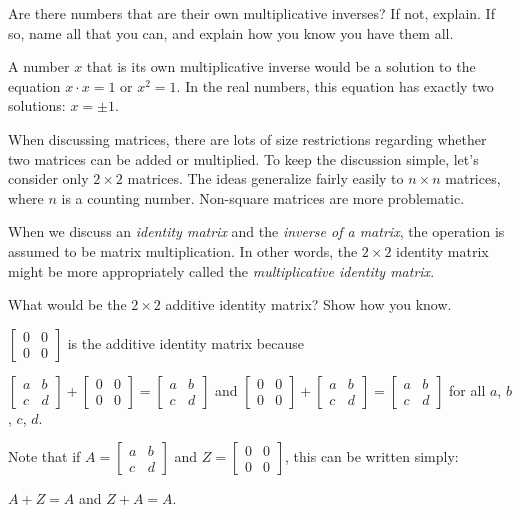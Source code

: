 \documentclass{ximera}
\begin{document}
\begin{question}
Are there numbers that are their own multiplicative inverses?  If not, explain.  If so, name all that you can, and explain how you know you have them all.
\begin{freeResponse}
A number $x$ that is its own multiplicative inverse would be a solution to the equation $x\cdot x=1$ or $x^2=1$.  In the real numbers, this equation has exactly two solutions:  $x = \pm 1$.  
\end{freeResponse}
\end{question}

When discussing matrices, there are lots of size restrictions
regarding whether two matrices can be added or multiplied.  To keep
the discussion simple, let's consider only $2\times 2$ matrices.  The
ideas generalize fairly easily to $n\times n$ matrices, where $n$ is a
counting number.  Non-square matrices are more problematic.

When we discuss an \emph{identity matrix} and the \emph{inverse of a
  matrix}, the operation is assumed to be matrix multiplication.  In
other words, the $2\times 2$ identity matrix might be more
appropriately called the \emph{multiplicative identity matrix}.

\begin{question}
What would be the $2\times 2$ additive identity matrix?  Show how you
know.
\begin{freeResponse}
$\begin{bmatrix} 0&0 \\ 0&0 \end{bmatrix}$ is the additive identity matrix because 

$\begin{bmatrix} a&b \\ c&d \end{bmatrix} + \begin{bmatrix} 0&0 \\ 0&0 \end{bmatrix} = 
\begin{bmatrix} a&b \\ c&d \end{bmatrix}$  
and
$\begin{bmatrix} 0&0 \\ 0&0 \end{bmatrix} + \begin{bmatrix} a&b \\ c&d \end{bmatrix} = 
\begin{bmatrix} a&b \\ c&d \end{bmatrix}$  for all $a$, $b$, $c$, $d$.  

Note that if $A = \begin{bmatrix} a&b \\ c&d \end{bmatrix}$ and $Z = \begin{bmatrix} 0&0 \\ 0&0 \end{bmatrix}$, this can be written simply:  

$A + Z = A$ and $Z+A = A$.  
\end{freeResponse}
\end{question}
\end{document}
